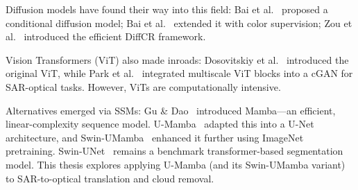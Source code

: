 Diffusion models have found their way into this field: Bai et al.~\cite{bai2023} proposed a conditional diffusion model; Bai et al.~\cite{bai2024} extended it with color supervision; Zou et al.~\cite{zou2023} introduced the efficient DiffCR framework.

Vision Transformers (ViT) also made inroads: Dosovitskiy et al.~\cite{dosovitskiy2020} introduced the original ViT, while Park et al.~\cite{park2025} integrated multiscale ViT blocks into a cGAN for SAR-optical tasks. However, ViTs are computationally intensive.

Alternatives emerged via SSMs: Gu \& Dao~\cite{gu2023} introduced Mamba—an efficient, linear-complexity sequence model. U-Mamba~\cite{umamba2024} adapted this into a U-Net architecture, and Swin-UMamba~\cite{swinumamba2024} enhanced it further using ImageNet pretraining. Swin-UNet~\cite{swinunet2023} remains a benchmark transformer-based segmentation model. This thesis explores applying U-Mamba (and its Swin-UMamba variant) to SAR-to-optical translation and cloud removal.

